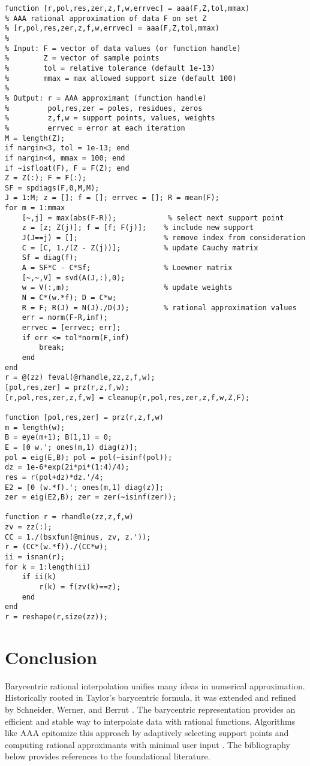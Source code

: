 \documentclass{article}
\begin{document}
\begin{verbatim}
function [r,pol,res,zer,z,f,w,errvec] = aaa(F,Z,tol,mmax)
% AAA rational approximation of data F on set Z
% [r,pol,res,zer,z,f,w,errvec] = aaa(F,Z,tol,mmax)
%
% Input: F = vector of data values (or function handle)
%        Z = vector of sample points
%        tol = relative tolerance (default 1e-13)
%        mmax = max allowed support size (default 100)
%
% Output: r = AAA approximant (function handle)
%         pol,res,zer = poles, residues, zeros
%         z,f,w = support points, values, weights
%         errvec = error at each iteration
M = length(Z);
if nargin<3, tol = 1e-13; end
if nargin<4, mmax = 100; end
if ~isfloat(F), F = F(Z); end
Z = Z(:); F = F(:);
SF = spdiags(F,0,M,M);
J = 1:M; z = []; f = []; errvec = []; R = mean(F);
for m = 1:mmax
    [~,j] = max(abs(F-R));            % select next support point
    z = [z; Z(j)]; f = [f; F(j)];    % include new support
    J(J==j) = [];                    % remove index from consideration
    C = [C, 1./(Z - Z(j))];          % update Cauchy matrix
    Sf = diag(f);
    A = SF*C - C*Sf;                 % Loewner matrix
    [~,~,V] = svd(A(J,:),0);
    w = V(:,m);                      % update weights
    N = C*(w.*f); D = C*w;
    R = F; R(J) = N(J)./D(J);        % rational approximation values
    err = norm(F-R,inf);
    errvec = [errvec; err];
    if err <= tol*norm(F,inf)
        break;
    end
end
r = @(zz) feval(@rhandle,zz,z,f,w);
[pol,res,zer] = prz(r,z,f,w);
[r,pol,res,zer,z,f,w] = cleanup(r,pol,res,zer,z,f,w,Z,F);

function [pol,res,zer] = prz(r,z,f,w)
m = length(w);
B = eye(m+1); B(1,1) = 0;
E = [0 w.'; ones(m,1) diag(z)];
pol = eig(E,B); pol = pol(~isinf(pol));
dz = 1e-6*exp(2i*pi*(1:4)/4);
res = r(pol+dz)*dz.'/4;
E2 = [0 (w.*f).'; ones(m,1) diag(z)];
zer = eig(E2,B); zer = zer(~isinf(zer));

function r = rhandle(zz,z,f,w)
zv = zz(:);
CC = 1./(bsxfun(@minus, zv, z.'));
r = (CC*(w.*f))./(CC*w);
ii = isnan(r);
for k = 1:length(ii)
    if ii(k)
        r(k) = f(zv(k)==z);
    end
end
r = reshape(r,size(zz));
\end{verbatim}

\section{Conclusion}
Barycentric rational interpolation unifies many ideas in numerical approximation.  Historically rooted in Taylor's barycentric formula, it was extended and refined by Schneider, Werner, and Berrut \cite{SchneiderWerner1986,BerrutMittelmann1997,BerrutBaltenspergerMittelmann2005}.  The barycentric representation provides an efficient and stable way to interpolate data with rational functions.  Algorithms like AAA epitomize this approach by adaptively selecting support points and computing rational approximants with minimal user input \cite{Nakatsukasa2018}.  The bibliography below provides references to the foundational literature.
\end{document}
